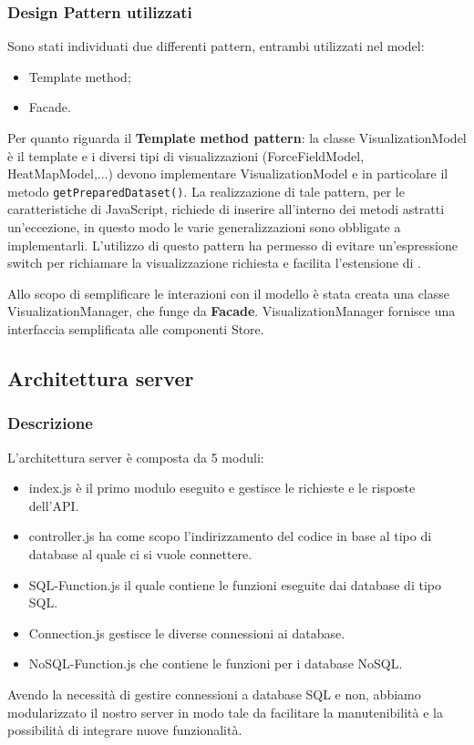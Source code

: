     \subsubsection{Design Pattern utilizzati}
        Sono stati individuati due differenti pattern, entrambi utilizzati nel model:
        \begin{itemize}
            \item Template method;
            \item Facade.
        \end{itemize}
        Per quanto riguarda il \textbf{Template method pattern}: la classe VisualizationModel è il template e i diversi tipi di visualizzazioni (ForceFieldModel, HeatMapModel,...) devono implementare VisualizationModel e in particolare il metodo \texttt{getPreparedDataset()}. La realizzazione di tale pattern, per le caratteristiche di JavaScript\glo , richiede di inserire all'interno dei metodi astratti un'eccezione, in questo modo le varie generalizzazioni sono obbligate a implementarli. L'utilizzo di questo pattern ha permesso di evitare un'espressione switch per richiamare la visualizzazione richiesta e facilita l'estensione di \hd .
        
        Allo scopo di semplificare le interazioni con il modello è stata creata una classe VisualizationManager, che funge da \textbf{Facade}. VisualizationManager fornisce una interfaccia semplificata alle componenti Store.
        
        \pagebreak
        
\subsection{Architettura server}
    \subsubsection{Descrizione}
    L'architettura server è composta da 5 moduli:
    \begin{itemize}
            \item index.js è il primo modulo eseguito e gestisce le richieste e le risposte dell'API.
            \item  controller.js ha come scopo l'indirizzamento del codice in base al tipo di database al quale ci si vuole connettere.
            \item SQL-Function.js il quale contiene le funzioni eseguite dai database di tipo SQL.
            \item Connection.js gestisce le diverse connessioni ai database.
            \item NoSQL-Function.js che contiene le funzioni per i database NoSQL.
        \end{itemize}
    Avendo la necessità di gestire connessioni a database SQL e non, abbiamo modularizzato il nostro server in modo tale da facilitare la manutenibilità e la possibilità di integrare nuove funzionalità.
    
